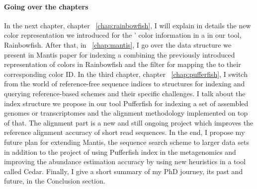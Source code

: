 \paragraph*{Going over the chapters}
In the next chapter, chapter ~\ref{chap:rainbowfish}, I will explain in details the new color representation we
introduced for the \kmers' color information in a \ccdbg in our tool, Rainbowfish.
After that, in ~\ref{chap:mantis}, I go over the data structure we present in Mantis paper
for indexing a \ccdbg combining the previously introduced representation of colors in Rainbowfish and
the \cqf filter for mapping the \kmers to their corresponding color ID.
In the third chapter, chapter ~\ref{chap:pufferfish},
I switch from the world of reference-free sequence indices
to structures for indexing and querying reference-based schemes and their specific challenges.
I talk about the index structure we propose in our tool Pufferfish for indexing a set of
assembled genomes or transcriptomes and the alignment methodology implemented on top of that.
The alignment part is a new and still ongoing project which improves the reference
alignment accuracy of short read sequences.
In the end, I propose my future plan for extending Mantis, the sequence search scheme to
larger data sets in addition to the project of using Pufferfish index in the metagenomics
and improving the abundance estimation accuracy by using new heuristics in a tool called Cedar.
Finally, I give a short summary of my PhD journey, its past and future, in the Conclusion section.